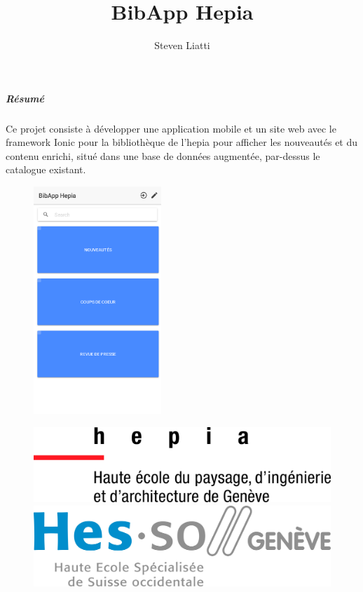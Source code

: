 \documentclass[a4paper, 12pt]{article}
\begin{document}
\title{BibApp Hepia}
\author{Steven Liatti}
\maketitle

\subparagraph{Résumé}
Ce projet consiste à développer une application mobile et un site web avec le framework Ionic pour 
la bibliothèque de l'hepia pour afficher les nouveautés et du contenu enrichi, situé dans une base de 
données augmentée, par-dessus le catalogue existant. 

\begin{figure}
	\begin{center}
		\includegraphics[width=0.43\textwidth]{images/screenshots/android1.png}
	\end{center}
\end{figure}

\begin{figure}[!b]
	\centering
	\begin{minipage}{.4\textwidth}
		\centering
		\includegraphics[width=.6\linewidth]{images/hepia.jpg}
	\end{minipage}%
	\begin{minipage}{.4\textwidth}
		\centering
		\includegraphics[width=.6\linewidth]{images/hesso.jpg}
	\end{minipage}
\end{figure}
\newpage
\end{document}
